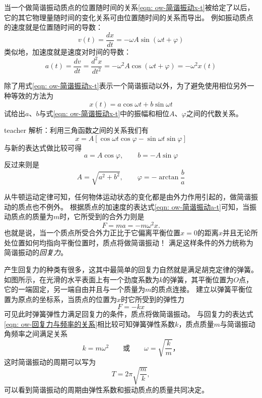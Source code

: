 当一个做简谐振动质点的位置随时间的关系\ref{eqn: ow-简谐振动x-t}被给定了以后，它的其它物理量随时间的变化关系可由位置随时间的关系而导出。
例如振动质点的速度就是位置随时间的导数：
\begin{equation}\label{eqn: ow-简谐振动v-t}
v(t)=\frac{dx}{dt} = -\omega A\sin(\omega t+\varphi)
\end{equation}
类似地，加速度就是速度对时间的导数：
\begin{equation}\label{eqn: ow-简谐振动a-t}
a(t) = \frac{dv}{dt}=\frac{d^2x}{dt^2} = -\omega^2 A\cos(\omega t+\varphi) =-\omega^2 x(t)
\end{equation}




\begin{example}
除了用式\ref{eqn: ow-简谐振动x-t}表示一个简谐振动以外，为了避免使用相位另外一种等效的方法为
\[
x(t)=a\cos\omega  t+b\sin\omega t
\]
试给出$a、b$与式\ref{eqn: ow-简谐振动x-t}中的振幅和相位$A、\varphi$之间的代数关系。
\begin{taggedblock}{teacher}
\newline
解析：利用三角函数之间的关系我们有
\[x=A[\cos\omega t\cos\varphi -\sin\omega t\sin\varphi ]\]
与新的表达式做比较可得
\[
a = A\cos\varphi,\qquad b =- A\sin\varphi
\]
反过来则是
\[
A = \sqrt{a^2+b^2},\qquad \varphi =- \arctan\frac{b}{a}
\]
\end{taggedblock}
\end{example}


从牛顿运动定律可知，任何物体运动状态的变化都是由外力作用引起的，做简谐振动的质点也不例外。
根据质点的加速度的表达式\ref{eqn: ow-简谐振动a-t}可知，当振动质点的质量为$m$时，它所受到的合外力则是
\begin{equation}\label{eqn: ow-回复力与频率的关系}
F=ma = -m\omega^2 x.
\end{equation}
也就是说，当一个质点所受合外力正比于它偏离平衡位置$x=0$的距离$x$并且无论所处位置如何均指向平衡位置时，质点将做简谐振动！
满足这样条件的外力统称为简谐振动的\emph{回复力}。

产生回复力的种类有很多，这其中最简单的回复力自然就是满足胡克定律的弹簧。
如图所示，在光滑的水平表面上有一个劲度系数为$k$的弹簧，其平衡位置为$O$点，它的一端固定，另一端自由并且与一个质量为$m$的质点连接。
建立以弹簧平衡位置为原点的坐标系，当质点的位置为$x$时它所受到的弹性力
\begin{equation}
F=-kx
\end{equation}
可见此时弹簧弹性力满足回复力的条件，质点将做简谐振动。
与回复力的表达式\ref{eqn: ow-回复力与频率的关系}相比较可知弹簧弹性系数$k$，质点质量$m$与简谐振动角频率之间满足关系
\begin{equation}
k=m\omega^2\qquad \textbf{或}\qquad \omega=\sqrt{\frac{k}{m}}，
\end{equation}
这时简谐振动的周期可以写为
\begin{equation}
T = 2\pi\sqrt{\frac{m}{k}},
\end{equation}
可以看到简谐振动的周期由弹性系数和振动质点的质量共同决定。

